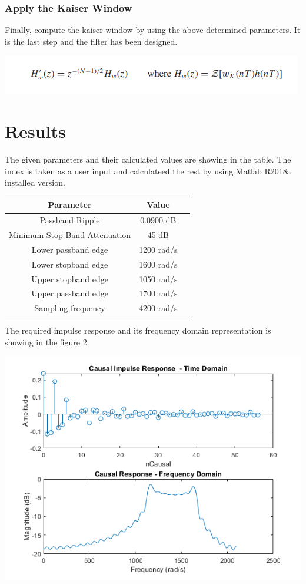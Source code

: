\documentclass[oneside,11pt,onecolumn,a4paper]{report}
\begin{document}
\subsection{Apply the Kaiser Window}

\hspace{4em}Finally, compute the kaiser window by using the above determined parameters. It is the last step and the filter has been designed.

\includegraphics{Screenshot (180)}

\pagebreak

\chapter{Results}
\hspace{4em}The given parameters and their calculated values are showing in the table. The index is taken as a user input and calculateed the rest by using Matlab R2018a installed version. 
\begin{center}
\begin{tabular}{ |c|c|c| } 
\hline
Parameter & Value \\
\hline
Passband Ripple & 0.0900 dB \\ 
Minimum Stop Band Attenuation & 45 dB\\ 
Lower passband edge & 1200 rad/s \\ 
Lower stopband edge & 1600 rad/s \\ 
Upper stopband edge & 1050 rad/s \\ 
Upper passband edge & 1700 rad/s \\ 
Sampling frequency & 4200 rad/s \\ 
\hline
\end{tabular}
\end{center}

The required impulse response and its frequency domain representation is showing in the figure 2. 

\includegraphics[scale=0.8]{impulse}
\end{document}

